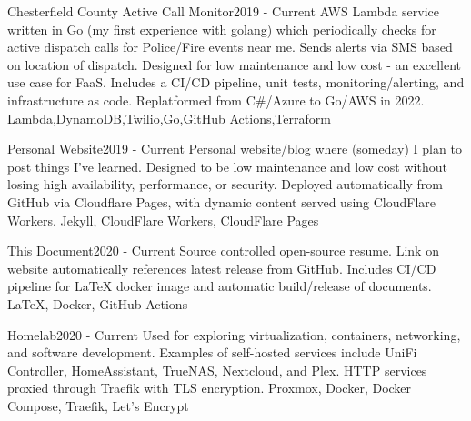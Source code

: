 \begin{projects}
    \project
    {Chesterfield County Active Call Monitor}{2019 - Current}
    {}
    {AWS Lambda service written in Go (my first experience with golang) which periodically checks for active dispatch calls for Police/Fire events near me. Sends alerts via SMS based on location of dispatch. Designed for low maintenance and low cost - an excellent use case for FaaS. Includes a CI/CD pipeline, unit tests, monitoring/alerting, and infrastructure as code. Replatformed from C\#/Azure to Go/AWS in 2022.}
    {Lambda,DynamoDB,Twilio,Go,GitHub Actions,Terraform}

    \ifcv
    \project
    {Personal Website}{2019 - Current}
    {}
    {Personal website/blog where (someday) I plan to post things I've learned. Designed to be low maintenance and low cost without losing high availability, performance, or security. Deployed automatically from GitHub via Cloudflare Pages, with dynamic content served using CloudFlare Workers.}
    {Jekyll, CloudFlare Workers, CloudFlare Pages}
    \fi

    \project
    {This Document}{2020 - Current}
    {\thislink{\website}}
    {Source controlled open-source resume. Link on website automatically references latest release from GitHub. Includes CI/CD pipeline for LaTeX docker image and automatic build/release of documents.}
    {\LaTeX, Docker, GitHub Actions}

    \ifcv
    \project
    {Homelab}{2020 - Current}
    {}
    {Used for exploring virtualization, containers, networking, and software development. Examples of self-hosted services include UniFi Controller, HomeAssistant, TrueNAS, Nextcloud, and Plex. HTTP services proxied through Traefik with TLS encryption.}
    {Proxmox, Docker, Docker Compose, Traefik, Let's Encrypt}
    \fi
\end{projects}
